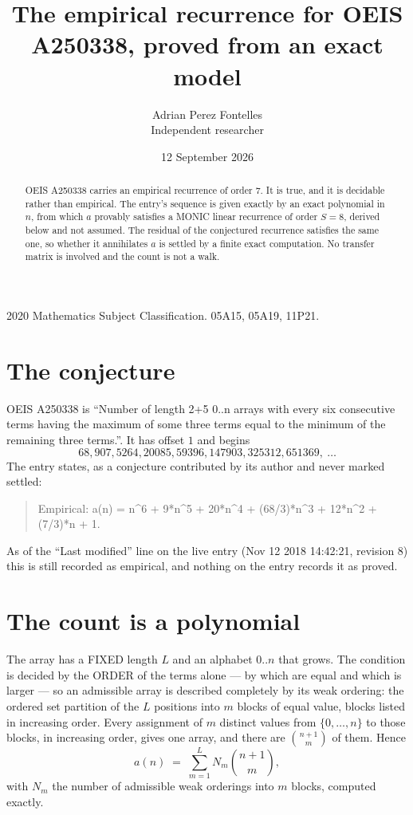 \documentclass[11pt,a4paper]{article}
\title{The empirical recurrence for OEIS A250338, proved from an exact model}
\author{Adrian Perez Fontelles\\ \small Independent researcher}
\date{12 September 2026}
\theoremstyle{plain}
\theoremstyle{definition}
\begin{document}
\maketitle

\begin{abstract}
OEIS A250338 carries an empirical recurrence of order $7$. It is true, and it is
decidable rather than empirical. The entry's sequence is given exactly by an exact polynomial in $n$, from
which $a$ provably satisfies a MONIC linear recurrence of order $S=8$, derived below and not
assumed. The residual of the conjectured recurrence satisfies the same one, so whether it
annihilates $a$ is settled by a finite exact computation. No transfer matrix is involved and
the count is not a walk.
\end{abstract}

\noindent\small 2020 Mathematics Subject Classification. 05A15, 05A19, 11P21.\normalsize

\section{The conjecture}

OEIS A250338 is ``Number of length 2+5 0..n arrays with every six consecutive terms having the maximum of some three terms equal to the minimum of the remaining three terms.''. It has offset $1$ and begins
\[
68, 907, 5264, 20085, 59396, 147903, 325312, 651369,\ \dots
\]
The entry states, as a conjecture contributed by its author and never marked settled:
\begin{quote}
Empirical: a(n) = n\^{}6 + 9*n\^{}5 + 20*n\^{}4 + (68/3)*n\^{}3 + 12*n\^{}2 + (7/3)*n + 1.
\end{quote}
As of the ``Last modified'' line on the live entry (Nov 12 2018 14:42:21, revision 8)
this is still recorded as empirical, and nothing on the entry records it as proved.

\section{The count is a polynomial}

The array has a FIXED length $L$ and an alphabet $0..n$ that grows. The condition is decided by
the ORDER of the terms alone --- by which are equal and which is larger --- so an admissible
array is described completely by its weak ordering: the ordered set partition of the $L$
positions into $m$ blocks of equal value, blocks listed in increasing order. Every assignment
of $m$ distinct values from $\{0,\dots,n\}$ to those blocks, in increasing order, gives one
array, and there are $\binom{n+1}{m}$ of them. Hence
\[
a(n)\;=\;\sum_{m=1}^{L} N_m\binom{n+1}{m},
\]
with $N_m$ the number of admissible weak orderings into $m$ blocks, computed exactly.
\end{document}
